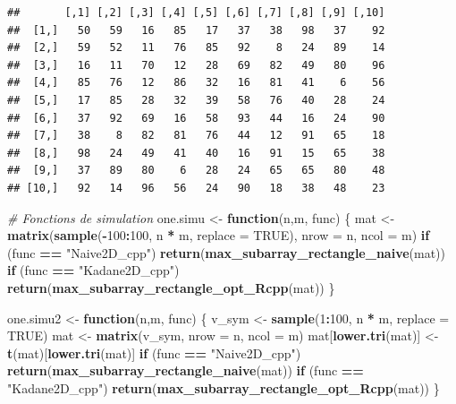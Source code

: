 \documentclass[
]{article}
\newenvironment{Shaded}{\begin{snugshade}}{\end{snugshade}}
\newcommand{\AttributeTok}[1]{\textcolor[rgb]{0.13,0.29,0.53}{#1}}
\newcommand{\CommentTok}[1]{\textcolor[rgb]{0.56,0.35,0.01}{\textit{#1}}}
\newcommand{\ConstantTok}[1]{\textcolor[rgb]{0.56,0.35,0.01}{#1}}
\newcommand{\ControlFlowTok}[1]{\textcolor[rgb]{0.13,0.29,0.53}{\textbf{#1}}}
\newcommand{\DecValTok}[1]{\textcolor[rgb]{0.00,0.00,0.81}{#1}}
\newcommand{\FunctionTok}[1]{\textcolor[rgb]{0.13,0.29,0.53}{\textbf{#1}}}
\newcommand{\NormalTok}[1]{#1}
\newcommand{\OtherTok}[1]{\textcolor[rgb]{0.56,0.35,0.01}{#1}}
\newcommand{\SpecialCharTok}[1]{\textcolor[rgb]{0.81,0.36,0.00}{\textbf{#1}}}
\newcommand{\StringTok}[1]{\textcolor[rgb]{0.31,0.60,0.02}{#1}}
\begin{document}
\begin{verbatim}
##       [,1] [,2] [,3] [,4] [,5] [,6] [,7] [,8] [,9] [,10]
##  [1,]   50   59   16   85   17   37   38   98   37    92
##  [2,]   59   52   11   76   85   92    8   24   89    14
##  [3,]   16   11   70   12   28   69   82   49   80    96
##  [4,]   85   76   12   86   32   16   81   41    6    56
##  [5,]   17   85   28   32   39   58   76   40   28    24
##  [6,]   37   92   69   16   58   93   44   16   24    90
##  [7,]   38    8   82   81   76   44   12   91   65    18
##  [8,]   98   24   49   41   40   16   91   15   65    38
##  [9,]   37   89   80    6   28   24   65   65   80    48
## [10,]   92   14   96   56   24   90   18   38   48    23
\end{verbatim}

\begin{Shaded}
\begin{Highlighting}[]
\CommentTok{\# Fonctions de simulation}
\NormalTok{one.simu }\OtherTok{\textless{}{-}} \ControlFlowTok{function}\NormalTok{(n,m, func) \{}
\NormalTok{  mat }\OtherTok{\textless{}{-}} \FunctionTok{matrix}\NormalTok{(}\FunctionTok{sample}\NormalTok{(}\SpecialCharTok{{-}}\DecValTok{100}\SpecialCharTok{:}\DecValTok{100}\NormalTok{, n }\SpecialCharTok{*}\NormalTok{ m, }\AttributeTok{replace =} \ConstantTok{TRUE}\NormalTok{), }\AttributeTok{nrow =}\NormalTok{ n, }\AttributeTok{ncol =}\NormalTok{ m)}
  \ControlFlowTok{if}\NormalTok{ (func }\SpecialCharTok{==} \StringTok{"Naive2D\_cpp"}\NormalTok{) }\FunctionTok{return}\NormalTok{(}\FunctionTok{max\_subarray\_rectangle\_naive}\NormalTok{(mat))}
  \ControlFlowTok{if}\NormalTok{ (func }\SpecialCharTok{==} \StringTok{"Kadane2D\_cpp"}\NormalTok{) }\FunctionTok{return}\NormalTok{(}\FunctionTok{max\_subarray\_rectangle\_opt\_Rcpp}\NormalTok{(mat))}
\NormalTok{\}}

\NormalTok{one.simu2 }\OtherTok{\textless{}{-}} \ControlFlowTok{function}\NormalTok{(n,m, func) \{}
\NormalTok{  v\_sym }\OtherTok{\textless{}{-}} \FunctionTok{sample}\NormalTok{(}\DecValTok{1}\SpecialCharTok{:}\DecValTok{100}\NormalTok{, n }\SpecialCharTok{*}\NormalTok{ m, }\AttributeTok{replace =} \ConstantTok{TRUE}\NormalTok{)}
\NormalTok{  mat }\OtherTok{\textless{}{-}} \FunctionTok{matrix}\NormalTok{(v\_sym, }\AttributeTok{nrow =}\NormalTok{ n, }\AttributeTok{ncol =}\NormalTok{ m)}
\NormalTok{  mat[}\FunctionTok{lower.tri}\NormalTok{(mat)] }\OtherTok{\textless{}{-}} \FunctionTok{t}\NormalTok{(mat)[}\FunctionTok{lower.tri}\NormalTok{(mat)]}
  \ControlFlowTok{if}\NormalTok{ (func }\SpecialCharTok{==} \StringTok{"Naive2D\_cpp"}\NormalTok{) }\FunctionTok{return}\NormalTok{(}\FunctionTok{max\_subarray\_rectangle\_naive}\NormalTok{(mat))}
  \ControlFlowTok{if}\NormalTok{ (func }\SpecialCharTok{==} \StringTok{"Kadane2D\_cpp"}\NormalTok{) }\FunctionTok{return}\NormalTok{(}\FunctionTok{max\_subarray\_rectangle\_opt\_Rcpp}\NormalTok{(mat))}
\NormalTok{\}}
\end{Highlighting}
\end{Shaded}
\end{document}

